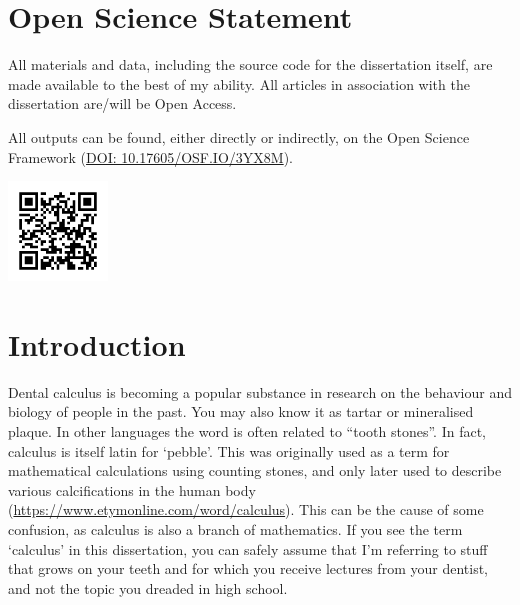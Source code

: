 \documentclass[
  b5paper,
]{book}
\begin{document}
\label{open-science-statement}

\chapter*{Open Science Statement}


All materials and data, including the source code for the dissertation
itself, are made available to the best of my ability. All articles in
association with the dissertation are/will be Open Access.

All outputs can be found, either directly or indirectly, on the Open
Science Framework (\href{https://doi.org/10.17605/OSF.IO/3YX8M}{DOI:
10.17605/OSF.IO/3YX8M}).

\begin{center}
\includegraphics[width=1.04167in,height=\textheight]{figures/osf-qr.png}
\end{center}


\chapter{Introduction}\label{chap-intro}

Dental calculus is becoming a popular substance in research on the
behaviour and biology of people in the past. You may also know it as
tartar or mineralised plaque. In other languages the word is often
related to ``tooth stones''. In fact, calculus is itself latin for
`pebble'. This was originally used as a term for mathematical
calculations using counting stones, and only later used to describe
various calcifications in the human body
(\url{https://www.etymonline.com/word/calculus}). This can be the cause
of some confusion, as calculus is also a branch of mathematics. If you
see the term `calculus' in this dissertation, you can safely assume that
I'm referring to stuff that grows on your teeth and for which you
receive lectures from your dentist, and not the topic you dreaded in
high school.
\end{document}
